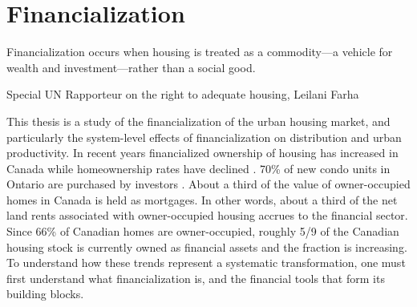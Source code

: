 \chapter{Financialization} \label{chapter-financialization}
\epigraph{Financialization occurs when housing is treated as a commodity---a vehicle for wealth and investment---rather than a social good.}{Special UN Rapporteur on the right to adequate housing, Leilani Farha \cite{farhaReportFinancializationHousing2017}}

This thesis is a study of the \gls{financialization} of the urban housing market, and particularly the system-level effects of financialization on distribution and urban productivity.  In recent years financialized ownership of housing has increased in Canada while homeownership rates have declined \cite{statisticscanadaBuyRentHousing2022}.
70\% of new condo units in Ontario are purchased by investors \cite{GET_ontario_condo_ownership}.  About a third of the value of owner-occupied homes in Canada is held as mortgages. In other words, about a third of the net land rents associated with owner-occupied housing accrues to the financial sector. Since 66\% of Canadian homes are owner-occupied, roughly 5/9 of the Canadian housing stock is currently owned as financial assets \cite{nemtinFinancializationHousingSocial2021} and the fraction is increasing. %
To understand how these trends represent a systematic transformation,  one must first understand what financialization is, and the financial tools that form its building blocks. 

